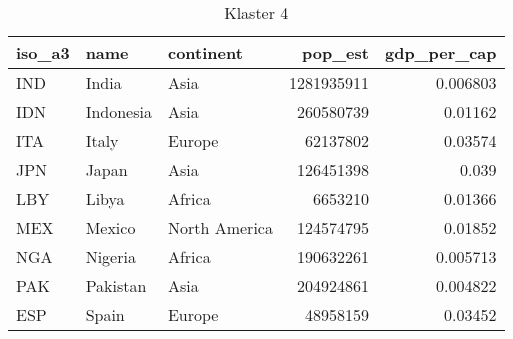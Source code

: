\begin{table}[h!]
   \centering
   \caption{Klaster 4}
   \label{tab:cl4}
   \begin{tabular}{lllrr}
      \toprule
      iso\_a3 & name      & continent     & pop\_est   & gdp\_per\_cap \\
      \midrule
      IND     & India     & Asia          & 1281935911 & 0.006803      \\
      IDN     & Indonesia & Asia          & 260580739  & 0.01162       \\
      ITA     & Italy     & Europe        & 62137802   & 0.03574       \\
      JPN     & Japan     & Asia          & 126451398  & 0.039         \\
      LBY     & Libya     & Africa        & 6653210    & 0.01366       \\
      MEX     & Mexico    & North America & 124574795  & 0.01852       \\
      NGA     & Nigeria   & Africa        & 190632261  & 0.005713      \\
      PAK     & Pakistan  & Asia          & 204924861  & 0.004822      \\
      ESP     & Spain     & Europe        & 48958159   & 0.03452       \\
      \bottomrule
   \end{tabular}
\end{table}
